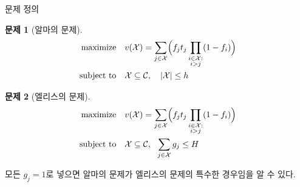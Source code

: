 \documentclass[10pt,slidestop,compress,mathserif,notheorems]{beamer}
\newif\ifen
\theoremstyle{definition}
\newtheorem{problem}{Problem}
\theoremstyle{definition}
\newtheorem{problem}{문제}
\begin{document}
\begin{frame}{\ifen Problem statement\else 문제 정의 \fi}
\begin{problem}[\ifen Alma’s problem\else 알마의 문제\fi]
\vspace{-1em}
\begin{align*}
\begin{split}
\text{maximize}\quad &  v(\mathcal{X}) = \sum_{j\in
\mathcal{X}} \Bigl( f_j t_j \prod_{\substack{i \in \mathcal{X}: \\ i > j}} (1 - f_{i}) \Bigr)\\
\text{subject to}\quad & \mathcal{X}\subseteq\mathcal{C}, \quad|\mathcal{X}| \leq h 
\end{split}
\end{align*}
\end{problem}
\begin{problem}[\ifen Ellis's problem\else 엘리스의 문제\fi]
\vspace{-1em}
\begin{align*}
\begin{split}
\text{maximize}\quad &  v(\mathcal{X}) = \sum_{j\in
\mathcal{X}} \Bigl(f_j t_j \prod_{\substack{i \in \mathcal{X}: \\ i > j}} (1 - f_{i}) \Bigr)\\
\text{subject to}\quad & \mathcal{X}\subseteq\mathcal{C},~~\sum_{j \in \mathcal{X}} g_j \leq H 
\end{split}
\end{align*}
\end{problem}

\ifen Set all $g_j = 1$ to see that Alma's problem is a special case of Ellis's problem. 
\else 모든 $g_j = 1$로 넣으면 알마의 문제가 엘리스의 문제의 특수한 경우임을 알 수 있다.  \fi
\end{frame}
\end{document}
